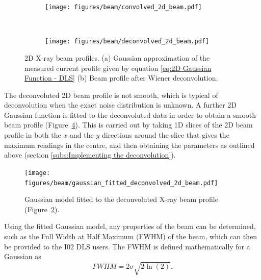 \begin{figure}
        \centering
        \begin{subfigure}[b]{1.0\textwidth}
                \centering
                \texttt{[image: figures/beam/convolved\_2d\_beam.pdf]}
                \caption{}
                \label{fig:Gaussian approximation of convolved Beam profile - DLS}
        \end{subfigure}
				\\
        \begin{subfigure}[b]{1.0\textwidth}
                \centering
                \texttt{[image: figures/beam/deconvolved\_2d\_beam.pdf]}
                \caption{}
                \label{fig:Deconvolved 2D beam profile - DLS}
        \end{subfigure}
        \caption[2D X-ray beam profile reconstructions.]{2D X-ray beam profiles.
        (a) Gaussian approximation of the measured current profile given by equation \ref{eq:2D Gaussian Function - DLS}
        (b) Beam profile after Wiener deconvolution.}
        \label{fig:2D relative X-ray beam profiles, convolved and deconvolved}
\end{figure}

The deconvoluted 2D beam profile is not smooth, which is typical of deconvolution when the exact noise distribution is unknown.
A further 2D Gaussian function is fitted to the deconvoluted data in order to obtain a smooth beam profile (Figure~\ref{fig:Gaussian model fitted to the 2D deconvolved profile - DLS}).
This is carried out by taking 1D slices of the 2D beam profile in both the $x$ and the $y$ directions around the slice that gives the maximum readings in the centre, and then obtaining the parameters as outlined above (section \ref{subs:Implementing the deconvolution}).
\begin{figure}
    \centering
    \texttt{[image: figures/beam/gaussian\_fitted\_deconvolved\_2d\_beam.pdf]}
    \caption[Gaussian model fitted to the deconvoluted X-ray beam profile.]{Gaussian model fitted to the deconvoluted X-ray beam profile (Figure~\ref{fig:Deconvolved 2D beam profile - DLS}).}
    \label{fig:Gaussian model fitted to the 2D deconvolved profile - DLS}
\end{figure}

Using the fitted Gaussian model, any properties of the beam can be determined, such as the Full Width at Half Maximum (FWHM) of the beam, which can then be provided to the I02 DLS users.
The FWHM is defined mathematically for a Gaussian as
\begin{equation}
FWHM = 2 \sigma \sqrt{2\ln(2)}.
\label{eq:FWHM mathematical definition}
\end{equation}

